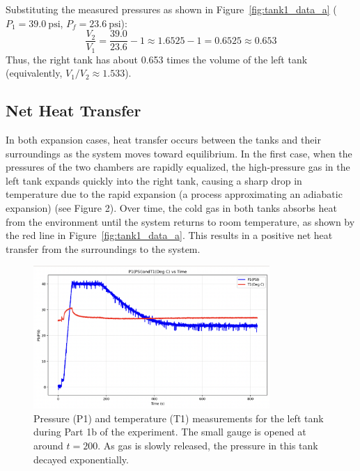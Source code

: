 \documentclass[12pt]{article}
\begin{document}
\newpage
Substituting the measured pressures as shown in Figure~\ref{fig:tank1_data_a} ($P_1 = 39.0~\text{psi}$, $P_f = 23.6~\text{psi}$):
\[ \frac{V_2}{V_1} = \frac{39.0}{23.6} - 1 \approx 1.6525 - 1 = 0.6525 \approx 0.653 \]
Thus, the right tank has about 0.653 times the volume of the left tank (equivalently, $V_1/V_2 \approx 1.533$).

\subsection*{Net Heat Transfer}
In both expansion cases, heat transfer occurs between the tanks and their surroundings as the system moves toward equilibrium. 
In the first case, when the pressures of the two chambers are rapidly equalized, the high-pressure gas in the left tank expands quickly into the right tank, causing a sharp drop in temperature due to the rapid expansion (a process approximating an adiabatic expansion) (see Figure 2). 
Over time, the cold gas in both tanks absorbs heat from the environment until the system returns to room temperature, as shown by the red line in Figure~\ref{fig:tank1_data_a}. This results in a positive net heat transfer from the surroundings to the system.

\begin{figure}[h!]
\centering
\includegraphics[width=0.8\textwidth]{1b-left_tank.png}
\caption{Pressure (P1) and temperature (T1) measurements for the left tank during Part 1b of the experiment. The small gauge is opened at around $t=200$. As gas is slowly released, the pressure in this tank decayed exponentially.}
\label{fig:tank1_data_b}
\end{figure}
\end{document}
